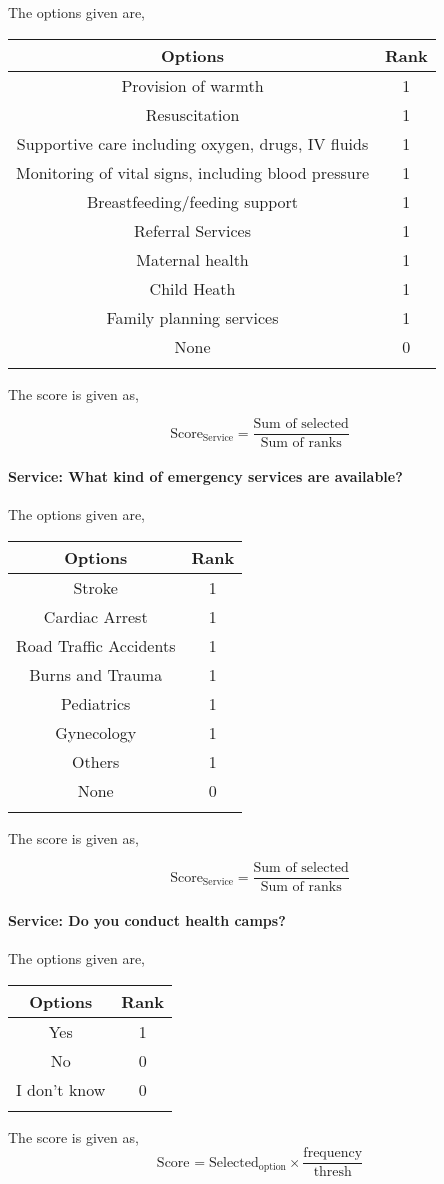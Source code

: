 \documentclass[oneside]{article}
\newcommand{\tsub}[2]{\text{#1}_{\text{#2}}}
\newcommand{\dsub}[2]{\dfrac{\text{#1}}{\text{#2}}}
\newcommand{\multsel}[1]
{
	\[
		\tsub{Score}{#1} = \dsub{Sum of selected}{Sum of ranks}
	\]
}
\newenvironment{ttable}
{
\begin{center}
\begin{tabular}{c|c}
\hline
}
{
\\ \hline
\end{tabular}
\end{center}
}
\begin{document}
The options given are,
\begin{ttable}
Options & Rank \\ \hline
Provision of warmth & 1 \\
Resuscitation & 1 \\
Supportive care including oxygen, drugs, IV fluids & 1 \\
Monitoring of vital signs, including blood pressure & 1 \\
Breastfeeding/feeding support & 1 \\
Referral Services & 1 \\
Maternal health & 1 \\
Child Heath & 1 \\
Family planning services & 1 \\
None & 0 \\
\hline
\end{ttable}
The score is given as,
\multsel{Service}
\paragraph{Service: What kind of emergency services are available?}

The options given are,
\begin{ttable}
Options & Rank \\ \hline
Stroke & 1 \\
Cardiac Arrest & 1 \\
Road Traffic Accidents & 1 \\
Burns and Trauma & 1 \\
Pediatrics & 1 \\
Gynecology & 1 \\
Others & 1 \\
None & 0 \\
\hline
\end{ttable}
The score is given as,
\multsel{Service}
\paragraph{Service: Do you conduct health camps?}

The options given are,
\begin{ttable}
Options & Rank \\ \hline
Yes & 1 \\
No & 0 \\
I don't know & 0 \\
\hline
\end{ttable}
The score is given as,
\[
	\tsub{Score}{} = \tsub{Selected}{option} \times \dsub{frequency}{thresh}
\]
\end{document}
